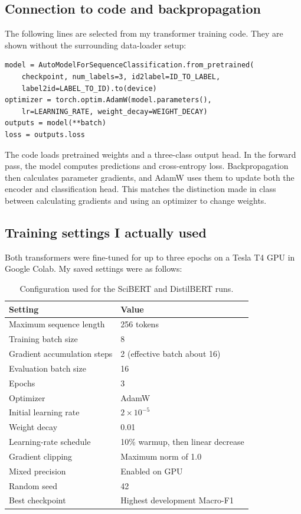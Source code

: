 \documentclass[11pt,letterpaper]{article}
\begin{document}
\subsection{Connection to code and backpropagation}
The following lines are selected from my transformer training code. They are shown without the surrounding data-loader setup:
\begin{lstlisting}[caption={Selected PyTorch/Hugging Face code used for fine-tuning.}]
model = AutoModelForSequenceClassification.from_pretrained(
    checkpoint, num_labels=3, id2label=ID_TO_LABEL,
    label2id=LABEL_TO_ID).to(device)
optimizer = torch.optim.AdamW(model.parameters(),
    lr=LEARNING_RATE, weight_decay=WEIGHT_DECAY)
outputs = model(**batch)
loss = outputs.loss
\end{lstlisting}
The code loads pretrained weights and a three-class output head. In the forward pass, the model computes predictions and cross-entropy loss. Backpropagation then calculates parameter gradients, and AdamW uses them to update both the encoder and classification head. This matches the distinction made in class between calculating gradients and using an optimizer to change weights.

\subsection{Training settings I actually used}
Both transformers were fine-tuned for up to three epochs on a Tesla T4 GPU in Google Colab. My saved settings were as follows:
\begin{table}[H]
\centering\small
\caption{Configuration used for the SciBERT and DistilBERT runs.}
\begin{tabular}{@{}ll@{}}\toprule
\textbf{Setting} & \textbf{Value}\\\midrule
Maximum sequence length & 256 tokens\\
Training batch size & 8\\
Gradient accumulation steps & 2 (effective batch about 16)\\
Evaluation batch size & 16\\
Epochs & 3\\
Optimizer & AdamW\\
Initial learning rate & $2\times10^{-5}$\\
Weight decay & 0.01\\
Learning-rate schedule & 10\% warmup, then linear decrease\\
Gradient clipping & Maximum norm of 1.0\\
Mixed precision & Enabled on GPU\\
Random seed & 42\\
Best checkpoint & Highest development Macro-F1\\\bottomrule
\end{tabular}
\end{table}
\end{document}
